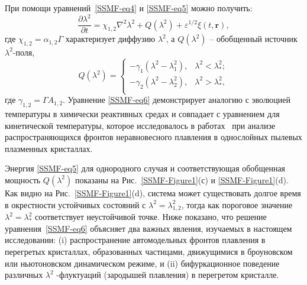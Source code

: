 При помощи уравнений~\eqref{SSMF-eq4} и \eqref{SSMF-eq5} можно получить:
\begin{equation}
  \label{SSMF-eq6}
  \frac{\partial \lambda^2}{\partial t} = \chi_{1,2} \nabla^2\lambda^2 + Q(\lambda^2) +  \varepsilon^{1/2}\xi(t,\mathbf{r}),
\end{equation}
где $ \chi_{1,2} = \alpha_{1,2} \Gamma$ характеризует диффузию $\lambda^2$,
а $ Q (\lambda ^ 2) $ -- обобщенный источник $ \lambda^2$-поля,
\begin{equation}
  \label{SSMF-eq7}
  Q(\lambda^2) =
  \left\{
  \begin{array}{ll}
    -\gamma_{1}\left(\lambda^2-\lambda_{1}^2\right), & \lambda^2  < \lambda_\ast^2; \\
    -\gamma_{2}\left(\lambda^2-\lambda_{2}^2\right), & \lambda^2 > \lambda_\ast^2,  \\
  \end{array}
  \right.
\end{equation}
где $\gamma_{1,2} = \Gamma A_{1,2}$.
Уравнение \eqref{SSMF-eq6} демонстрирует аналогию с эволюцией температуры в химически реактивных средах \cite{10.1088/0004-637x/805/1/59} и совпадает с уравнением для кинетической температуры, которое исследовалось в работах~\cite{10.1103/physreve.96.043201, 10.1103/physreve.97.043206, 10.1103/physreve.100.023203} при анализе распространяющихся фронтов неравновесного плавления в однослойных пылевых плазменных кристаллах.

Энергия \eqref{SSMF-eq5} для однородного случая и соответствующая обобщенная мощность $ Q (\lambda ^ 2) $ показаны на Рис.~\ref{SSMF-Figure1}(с) и \ref{SSMF-Figure1}(d).
Как видно на Рис.~\ref{SSMF-Figure1}(d), система может существовать долгое время в окрестности устойчивых состояний с $\lambda^2= \lambda_{1,2} ^ 2 $, тогда как пороговое значение $\lambda^2=\lambda_\ast^2$ соответствует неустойчивой точке.
Ниже показано, что решение уравнения~\eqref{SSMF-eq6} объясняет два важных явления, изучаемых в настоящем исследовании:
(i) распространение автомодельных фронтов плавления в перегретых кристаллах, образованных частицами, движущимися в броуновском или ньютоновском динамическом режиме, и (ii) бифуркационное поведение различных $\lambda^2$ -флуктуаций (зародышей плавления) в перегретом кристалле.

